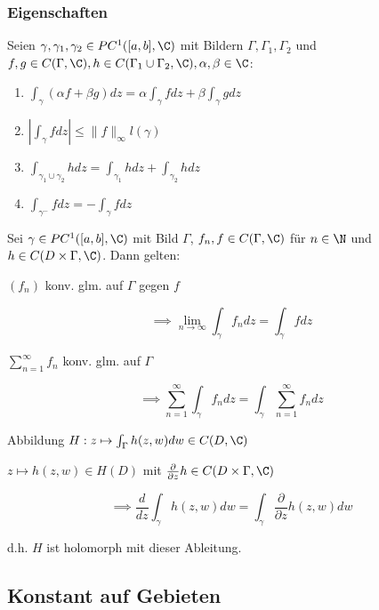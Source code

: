 \subsubsection*{Eigenschaften}

Seien \(\gamma, \gamma_1, \gamma_2 \in PC^1([a,b],\C)\) mit Bildern \(\Gamma, \Gamma_1, \Gamma_2\) und \(f, g \in C(\Gamma,\C), h \in C(\Gamma_1 \cup \Gamma_2, \C), \alpha, \beta \in \C\):

\begin{enumerate}[label=(\alph*)]
	\item \(\int_\gamma (\alpha f + \beta g) dz = \alpha \int_\gamma f dz + \beta \int_\gamma g dz\)
	\item \(|\int_\gamma f dz| \leq \|f\|_\infty l(\gamma)\)
	\item \(\int_{\gamma_1 \cup \gamma_2} h dz = \int_{\gamma_1} h dz + \int_{\gamma_2} h dz\)
	\item \(\int_{\gamma^-} f dz = - \int_{\gamma} f dz\)
\end{enumerate}

Sei \(\gamma \in PC^1([a,b],\C)\) mit Bild \(\Gamma\), \(f_n, f \in C(\Gamma,\C)\) für \(n \in \N\) und \(h \in C(D\times\Gamma,\C)\). Dann gelten:

\spacing

\((f_n)\) konv. glm. auf \(\Gamma\) gegen \(f\)

\vspace*{-2mm}
\[ \implies \displaystyle\lim_{n\to\infty} \int_\gamma f_n dz = \int_\gamma f dz \]

\(\sum_{n=1}^\infty f_n\) konv. glm. auf \(\Gamma\)

\vspace*{-2mm}
\[ \implies \displaystyle\sum_{n=1}^\infty \int_\gamma f_n dz = \int_\gamma \displaystyle\sum_{n=1}^\infty f_n dz \]

Abbildung \(H : z \mapsto \int_\Gamma h(z,w) dw \in C(D,\C)\)

\(z \mapsto h(z,w) \in H(D)\) mit \(\frac{\partial}{\partial z} h \in C(D \times \Gamma, \C)\)

\vspace*{-2mm}
\[ \implies \frac{d}{dz} \int_\gamma h(z,w) dw = \int_\gamma \frac{\partial}{\partial z} h(z,w) dw \]

d.h. \(H\) ist holomorph mit dieser Ableitung.

\subsection*{Konstant auf Gebieten}


